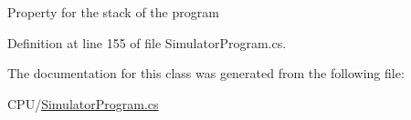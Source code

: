 Property for the stack of the program 



Definition at line 155 of file Simulator\+Program.\+cs.



The documentation for this class was generated from the following file\+:\begin{DoxyCompactItemize}
\item 
C\+P\+U/\hyperlink{_simulator_program_8cs}{Simulator\+Program.\+cs}\end{DoxyCompactItemize}

